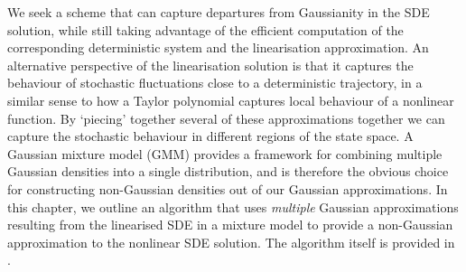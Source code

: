 


We seek a scheme that can capture departures from Gaussianity in the SDE solution, while still taking advantage of the efficient computation of the corresponding deterministic system and the linearisation approximation.
An alternative perspective of the linearisation solution is that it captures the behaviour of stochastic fluctuations close to a deterministic trajectory, in a similar sense to how a Taylor polynomial captures local behaviour of a nonlinear function.
By `piecing' together several of these approximations together we can capture the stochastic behaviour in different regions of the state space.
A Gaussian mixture model (GMM) provides a framework for combining multiple Gaussian densities into a single distribution, and is therefore the obvious choice for constructing non-Gaussian densities out of our Gaussian approximations.
In this chapter, we outline an algorithm that uses \emph{multiple} Gaussian approximations resulting from the linearised SDE in a mixture model to provide a non-Gaussian approximation to the nonlinear SDE solution.
The algorithm itself is provided in .


